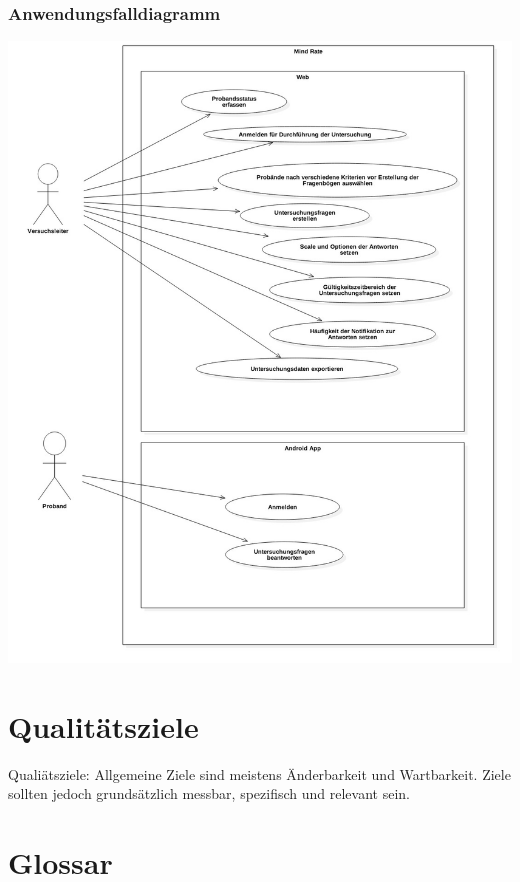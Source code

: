 \documentclass[a4paper]{scrreprt}
\begin{document}
            \newpage
            \subsection{Anwendungsfalldiagramm} 
                \vspace{0.4cm}
                \begin{center}
                    \includegraphics[scale = 0.4]{UseCaseDiagram1.jpg}
                \end{center}

        \newpage
 
    \chapter{Qualitätsziele}
        Qualiätsziele: Allgemeine Ziele sind meistens Änderbarkeit und Wartbarkeit.
        Ziele sollten jedoch grundsätzlich messbar, spezifisch und relevant sein.
 
    \chapter{Glossar}
 
    \listoffigures
 
\end{document}
